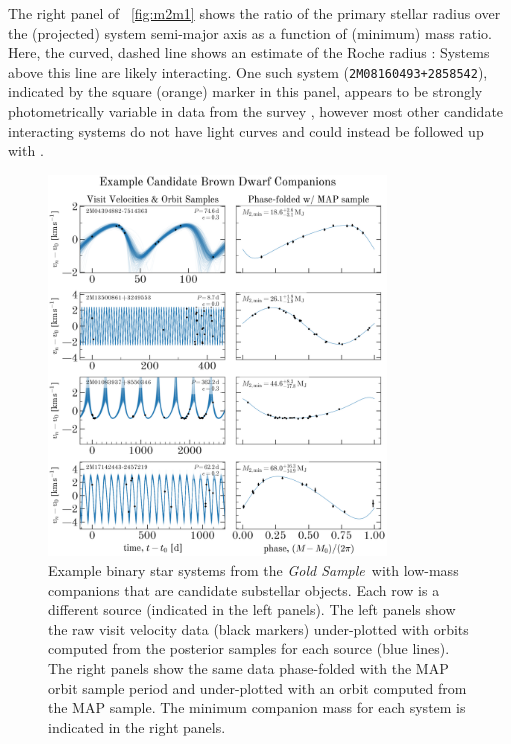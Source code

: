 \documentclass[modern]{aastex63}
\newcommand{\goldsample}{\textit{Gold Sample}}
\begin{document}
The right panel of \figurename~\ref{fig:m2m1} shows the ratio of the primary
stellar radius over the (projected) system semi-major axis as a function of
(minimum) mass ratio.
Here, the curved, dashed line shows an estimate of the Roche radius
\citep{Eggleton:1983}: Systems above this line are likely interacting.
One such system (\texttt{2M08160493+2858542}), indicated by the square (orange)
marker in this panel, appears to be strongly photometrically variable in data
from the  survey \citep{Shappee:2014, Jayasinghe:2019}, however
most other candidate interacting systems do not have  light
curves and could instead be followed up with  \citep{Ricker:2014}.

\begin{figure}[!t]
    \begin{center}
    \includegraphics[width=0.8\textwidth]{example-brown-dwarfs-placeholder.png}
    \end{center}
    \caption{%
    Example binary star systems from the \goldsample\ with low-mass companions
    that are candidate substellar objects.
    Each row is a different source (indicated in the left panels).
    The left panels show the raw visit velocity data (black markers)
    under-plotted with orbits computed from the posterior samples for each
    source (blue lines).
    The right panels show the same data phase-folded with the MAP orbit sample
    period and under-plotted with an orbit computed from the MAP sample.
    The minimum companion mass for each system is indicated in the right panels.
    \label{fig:brown-dwarfs}
    }
\end{figure}
\end{document}
